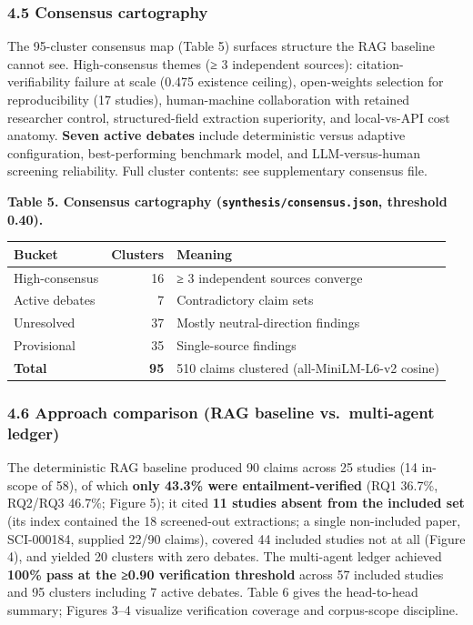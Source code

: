 \documentclass[11pt]{article}
\newcounter{none} %
\begin{document}
\subsubsection{4.5 Consensus cartography}\label{consensus-cartography}

The 95-cluster consensus map (Table 5) surfaces structure the RAG
baseline cannot see. High-consensus themes (≥ 3 independent sources):
citation-verifiability failure at scale (0.475 existence ceiling),
open-weights selection for reproducibility (17 studies), human-machine
collaboration with retained researcher control, structured-field
extraction superiority, and local-vs-API cost anatomy. \textbf{Seven
active debates} include deterministic versus adaptive configuration,
best-performing benchmark model, and LLM-versus-human screening
reliability. Full cluster contents: see supplementary consensus file.

\textbf{Table 5. Consensus cartography
(\texttt{synthesis/consensus.json}, threshold 0.40).}

{\def\LTcaptype{none} %
\begin{longtable}[]{@{}lrl@{}}
\toprule\noalign{}
Bucket & Clusters & Meaning \\
\midrule\noalign{}
\endhead
\bottomrule\noalign{}
\endlastfoot
High-consensus & 16 & ≥ 3 independent sources converge \\
Active debates & 7 & Contradictory claim sets \\
Unresolved & 37 & Mostly neutral-direction findings \\
Provisional & 35 & Single-source findings \\
\textbf{Total} & \textbf{95} & 510 claims clustered (all-MiniLM-L6-v2
cosine) \\
\end{longtable}
}

\subsubsection{4.6 Approach comparison (RAG baseline vs.~multi-agent
ledger)}\label{approach-comparison-rag-baseline-vs.-multi-agent-ledger}

The deterministic RAG baseline produced 90 claims across 25 studies (14
in-scope of 58), of which \textbf{only 43.3\% were entailment-verified}
(RQ1 36.7\%, RQ2/RQ3 46.7\%; Figure 5); it cited \textbf{11 studies
absent from the included set} (its index contained the 18 screened-out
extractions; a single non-included paper, SCI-000184, supplied 22/90
claims), covered 44 included studies not at all (Figure 4), and yielded
20 clusters with zero debates. The multi-agent ledger achieved
\textbf{100\% pass at the ≥0.90 verification threshold} across 57
included studies and 95 clusters including 7 active debates. Table 6
gives the head-to-head summary; Figures 3--4 visualize verification
coverage and corpus-scope discipline.
\end{document}
